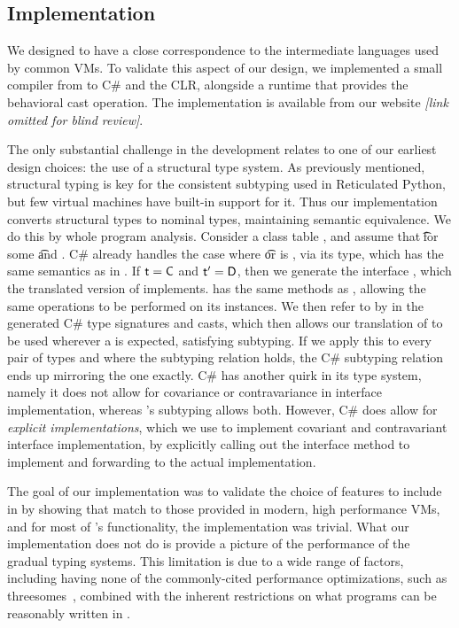 \documentclass[acmsmall, anonymous, authordraft, review]{acmart} %
\begin{document}
\subsection{Implementation}

We designed \kafka to have a close correspondence to the intermediate
languages used by common VMs. To validate this aspect of our design, we
implemented a small compiler from \kafka to C\# and the CLR, alongside a
runtime that provides the behavioral cast operation. The implementation is
available from our website \emph{[link omitted for blind review]}.

The only substantial challenge in the development relates to one of our earliest design
choices: the use of a structural type system. As previously mentioned,
structural typing is key for the consistent subtyping used in Reticulated
Python, but few virtual machines have built-in support for it. Thus our
implementation converts structural types to nominal types, maintaining
semantic equivalence.  We do this by whole program analysis. Consider a
class table \K, and assume that \StrSub{}\K\t\tp for some \t and \tp. C\#
already handles the case where \t or \tp is \any, via its  type,
which has the same semantics as \any in \kafka. If $\t=\C$ and $\tp=\D$,
then we generate the interface , which the translated version of \C
implements.  has the same methods as \D, allowing the same operations
to be performed on its instances. We then refer to \D by  in the
generated C\# type signatures and casts, which then allows our translation
of \C to be used wherever a \D is expected, satisfying subtyping. If we
apply this to every pair of types \C and \D where the subtyping relation
holds, the C\# subtyping relation ends up mirroring the \kafka one exactly.
C\# has another quirk in its type system, namely it does not allow for
covariance or contravariance in interface implementation, whereas \kafka's
subtyping allows both. However, C\# does allow for \emph{explicit
  implementations}, which we use to implement covariant and contravariant
interface implementation, by explicitly calling out the interface method to
implement and forwarding to the actual implementation.

The goal of our implementation was to validate the choice of features to
include in \kafka by showing that match to those provided in modern, high
performance VMs, and for most of \kafka's functionality, the implementation
was trivial. What our implementation does not do is provide a picture of the
performance of the gradual typing systems. This limitation is due to a wide
range of factors, including having none of the commonly-cited performance
optimizations, such as threesomes~\cite{siek10}, combined with the inherent
restrictions on what programs can be reasonably written in \kafka.
\end{document}
